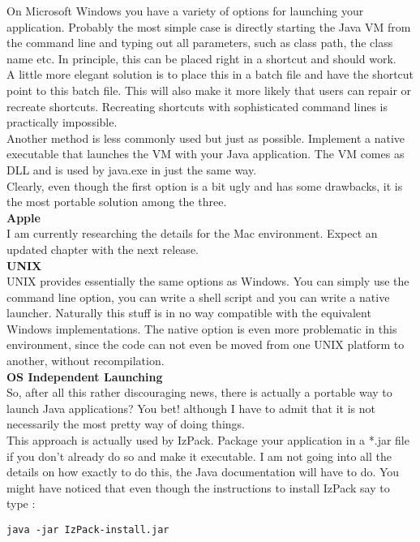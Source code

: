 On Microsoft Windows you have a variety of options for launching your
application. Probably the most simple case is directly starting the Java
VM from the command line and typing out all parameters, such as class
path, the class name etc. In principle, this can be placed right in a
shortcut and should work.\\

A little more elegant solution is to place this in a batch file and have
the shortcut point to this batch file. This will also make it more
likely that users can repair or recreate shortcuts. Recreating shortcuts
with sophisticated command lines is practically impossible.\\

Another method is less commonly used but just as possible. Implement a
native executable that launches the VM with your Java application. The
VM comes as DLL and is used by java.exe in just the same way.\\

Clearly, even though the first option is a bit ugly and has some
drawbacks, it is the most portable solution among the three.\\

\textbf{Apple}\\

I am currently researching the details for the Mac environment. Expect
an updated chapter with the next release.\\

\textbf{UNIX}\\

UNIX provides essentially the same options as Windows. You can simply
use the command line option, you can write a shell script and you can
write a native launcher. Naturally this stuff is in no way compatible
with the equivalent Windows implementations. The native option is even
more problematic in this environment, since the code can not even be
moved from one UNIX platform to another, without recompilation.\\

\textbf{OS Independent Launching}\\

So, after all this rather discouraging news, there is actually a
portable way to launch Java applications? You bet! although I have to
admit that it is not necessarily the most pretty way of doing things.\\

This approach is actually used by IzPack. Package your application in a
*.jar file if you don't already do so and make it executable. I am not
going into all the details on how exactly to do this, the Java
documentation will have to do. You might have noticed that even though
the instructions to install IzPack say to type :
\begin{verbatim}
java -jar IzPack-install.jar
\end{verbatim}\

